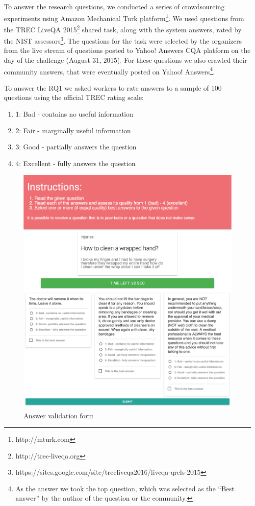 \documentclass[11pt,letterpaper]{article}
\begin{document}
To answer the research questions, we conducted a series of crowdsourcing experiments using Amazon Mechanical Turk platform\footnote{http://mturk.com}.
We used questions from the TREC LiveQA 2015\footnote{http://trec-liveqa.org} shared task, along with the system answers, rated by the NIST assessors\footnote{https://sites.google.com/site/trecliveqa2016/liveqa-qrels-2015}.
The questions for the task were selected by the organizers from the live stream of questions posted to Yahoo! Answers CQA platform on the day of the challenge (August 31, 2015).
For these questions we also crawled their community answers, that were eventually posted on Yahoo! Answers\footnote{As the answer we took the top question, which was selected as the ``Best answer'' by the author of the question or the community.}.

To answer the RQ1 we asked workers to rate answers to a sample of 100 questions using the official TREC rating scale:
\begin{enumerate}
\item 1: Bad - contains no useful information
\item 2: Fair - marginally useful information
\item 3: Good - partially answers the question
\item 4: Excellent - fully answers the question
\end{enumerate}

\begin{figure}[h!]
\includegraphics[width=1.0\linewidth]{img/validation_screenshot}
\caption{Answer validation form}
\label{fig:interfaces:validation}
\end{figure}
\end{document}
